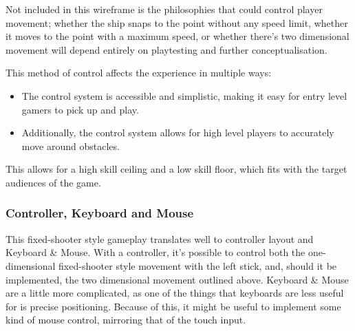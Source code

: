 \documentclass{scrartcl}
\begin{document}
Not included in this wireframe is the philosophies that could control player movement; whether the ship snaps to the point without any speed limit, whether it moves to the point with a maximum speed, or whether there's two dimensional movement will depend entirely on playtesting and further conceptualisation.

This method of control affects the experience in multiple ways:

\begin{itemize}
  \item The control system is accessible and simplistic, making it easy for entry level gamers to pick up and play.
  \item Additionally, the control system allows for high level players to accurately move around obstacles.
\end{itemize}

This allows for a high skill ceiling and a low skill floor, which fits with the target audiences of the game.

\subsubsection{Controller, Keyboard and Mouse}

This fixed-shooter style gameplay translates well to controller layout and Keyboard \& Mouse. With a controller, it's possible to control both the one-dimensional fixed-shooter style movement with the left stick, and, should it be implemented, the two dimensional movement outlined above. Keyboard \& Mouse are a little more complicated, as one of the things that keyboards are less useful for is precise positioning. Because of this, it might be useful to implement some kind of mouse control, mirroring that of the touch input.

\printbibliography
\end{document}
